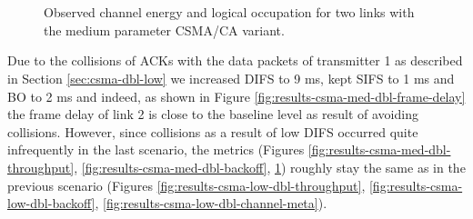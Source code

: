 \begin{figure}[tb]
	\label{fig:results-csma-med-dbl-channel-meta}
	\begin{center}
		\\
		\\
	\end{center}
	\caption{Observed channel energy and logical occupation for two links with the medium parameter CSMA/CA variant.}
\end{figure}

Due to the collisions of ACKs with the data packets of transmitter 1 as described in Section \ref{sec:csma-dbl-low} we increased DIFS to 9 ms, kept SIFS to 1 ms and BO to 2 ms and indeed, as shown in Figure \ref{fig:results-csma-med-dbl-frame-delay} the frame delay of link 2 is close to the baseline level as result of avoiding collisions. However, since collisions as a result of low DIFS occurred quite infrequently in the last scenario, the metrics (Figures \ref{fig:results-csma-med-dbl-throughput}, \ref{fig:results-csma-med-dbl-backoff}, \ref{fig:results-csma-med-dbl-channel-meta}) roughly stay the same as in the previous scenario (Figures \ref{fig:results-csma-low-dbl-throughput}, \ref{fig:results-csma-low-dbl-backoff}, \ref{fig:results-csma-low-dbl-channel-meta}).

